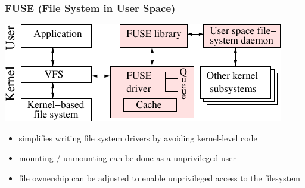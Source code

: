 

\begin{frame}
    \frametitle{FUSE (File System in User Space)}
    \begin{center}
        \includegraphics[width=.7\textwidth]{frames/img/fuse_arch}
    \end{center}
    
    \begin{itemize}
        \item simplifies writing file system drivers by avoiding kernel-level code
        \item mounting / unmounting can be done as a unprivileged user
        \item file ownership can be adjusted to enable unprivileged access to the filesystem
    \end{itemize}
    
\end{frame}